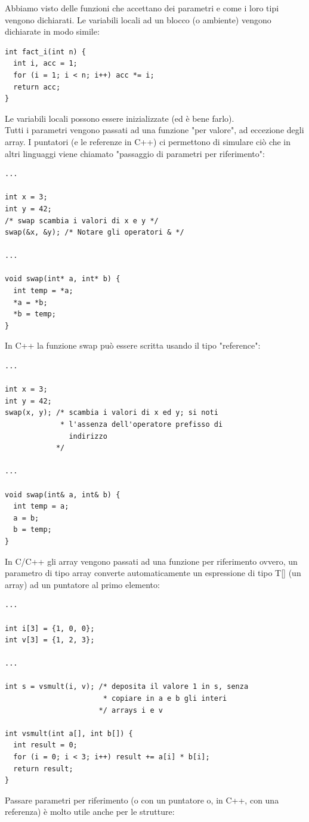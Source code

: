 \documentclass[a4paper,12pt, oneside]{book}
\begin{document}
Abbiamo visto delle funzioni che accettano dei parametri e
come i loro tipi vengono dichiarati. Le variabili locali ad un blocco (o ambiente) vengono dichiarate in modo simile:
\begin{verbatim}
int fact_i(int n) {
  int i, acc = 1;
  for (i = 1; i < n; i++) acc *= i;
  return acc;
}
\end{verbatim}
Le variabili locali possono essere inizializzate (ed è bene farlo).\\
Tutti i parametri vengono passati ad una funzione "per valore", ad eccezione degli array. I puntatori (e le referenze in C++) ci permettono di simulare ciò che in
altri linguaggi viene chiamato "passaggio di parametri per riferimento":
\begin{verbatim}
...

int x = 3;
int y = 42; 
/* swap scambia i valori di x e y */
swap(&x, &y); /* Notare gli operatori & */

...

void swap(int* a, int* b) {
  int temp = *a;
  *a = *b;
  *b = temp;
}
\end{verbatim}
In C++ la funzione swap può essere scritta usando il tipo "reference":
\begin{verbatim}
...

int x = 3;
int y = 42;
swap(x, y); /* scambia i valori di x ed y; si noti 
             * l'assenza dell'operatore prefisso di
               indirizzo 
            */

...

void swap(int& a, int& b) {
  int temp = a;
  a = b;
  b = temp;
}
\end{verbatim}
In C/C++ gli array vengono passati ad una funzione per riferimento ovvero, un parametro di tipo array converte automaticamente un espressione di
tipo T[] (un array) ad un puntatore al primo elemento:
\begin{verbatim}
...

int i[3] = {1, 0, 0};
int v[3] = {1, 2, 3};

...

int s = vsmult(i, v); /* deposita il valore 1 in s, senza
                       * copiare in a e b gli interi
                      */ arrays i e v

int vsmult(int a[], int b[]) {
  int result = 0;
  for (i = 0; i < 3; i++) result += a[i] * b[i];
  return result;
}
\end{verbatim}
Passare parametri per riferimento (o con un puntatore o, in C++, con una
referenza) è molto utile anche per le strutture:
\end{document}
